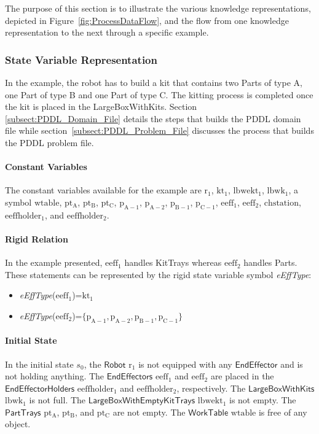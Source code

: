The purpose of this section is to illustrate the various knowledge representations, depicted in Figure~\ref{fig:ProcessDataFlow}, and the flow from one knowledge representation to the next through a specific example.

\subsubsection{State Variable Representation}

In the example, the robot has to build a kit that contains two \textsf{Parts} of type A, one \textsf{Part} of type B and one \textsf{Part} of type C. The kitting process is completed once the kit is placed in the \textsf{LargeBoxWithKits}. Section \ref{subsect:PDDL_Domain_File} details the steps that builds the PDDL domain file while section~\ref{subsect:PDDL_Problem_File} discusses the process that builds the PDDL problem file. 

\paragraph{Constant Variables}
The constant variables available for the example are $\mathrm{r_1}$, $\mathrm{kt_1}$, $\mathrm{lbwekt_1}$, $\mathrm{lbwk_1}$, a symbol $\mathrm{wtable}$, $\mathrm{pt_A}$, $\mathrm{pt_B}$, $\mathrm{pt_C}$, $\mathrm{p_{A-1}}$, $\mathrm{p_{A-2}}$, $\mathrm{p_{B-1}}$, $\mathrm{p_{C-1}}$, $\mathrm{eeff_1}$, $\mathrm{eeff_2}$, $\mathrm{chstation}$, $\mathrm{eeffholder_1}$, and $\mathrm{eeffholder_2}$.


\paragraph{Rigid Relation}
In the example presented, $\mathrm{eeff_1}$ handles \textsf{KitTrays} whereas $\mathrm{eeff_2}$ handles \textsf{Parts}. These statements can be represented by the rigid state variable symbol \emph{eEffType}:
\begin{itemize}
\item \emph{eEffType}($\mathrm{eeff_1}$)=$\mathrm{kt_1}$
\item \emph{eEffType}($\mathrm{eeff_2}$)=$\lbrace \mathrm{p_{A-1}}, \mathrm{p_{A-2}}, \mathrm{p_{B-1}}, \mathrm{p_{C-1}}\rbrace$
\end{itemize}

\paragraph{Initial State}
In the initial state $s_0$, the $\mathsf{Robot}$ $\mathrm{r_1}$ is not equipped with any $\mathsf{EndEffector}$ and is not holding anything. The $\mathsf{EndEffectors}$ $\mathrm{eeff_1}$ and $\mathrm{eeff_2}$ are placed in the $\mathsf{EndEffectorHolders}$ $\mathrm{eeffholder_1}$ and $\mathrm{eeffholder_2}$, respectively. The $\mathsf{LargeBoxWithKits}$ $\mathrm{lbwk_1}$ is not full. The $\mathsf{LargeBoxWithEmptyKitTrays}$ $\mathrm{lbwekt_1}$ is not empty. The $\mathsf{PartTrays}$ $\mathrm{pt_A}$, $\mathrm{pt_B}$, and $\mathrm{pt_C}$ are not empty. The $\mathsf{WorkTable}$ $\mathrm{wtable}$ is free of any object.

